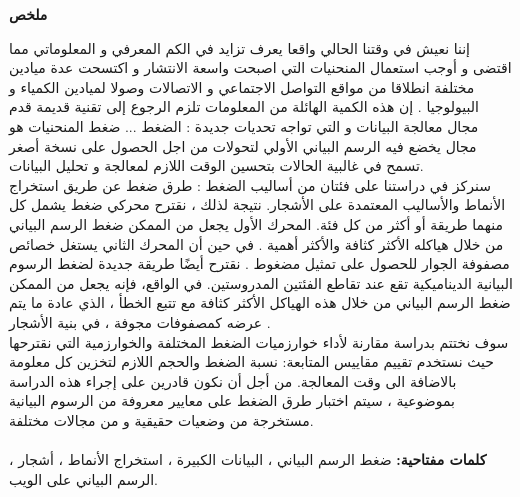 \documentclass[12pt,a4paper]{report}
\begin{document}
\begin{center}
\thispagestyle{plain}

	\par
	\textbf{
		\vskip 0.5in
		\LARGE ملخص
			 \\[0.35in]}
\end{center}


	\par
\begin{otherlanguage}{arabic}

إننا نعيش في وقتنا الحالي واقعا يعرف تزايد في الكم المعرفي و المعلوماتي مما اقتضى و أوجب استعمال المنحنيات التي اصبحت واسعة الانتشار و اكتسحت عدة ميادين مختلفة انطلاقا من مواقع التواصل الاجتماعي و الاتصالات وصولا لميادين الكمياء و البيولوجيا .  إن  هذه الكمية الهائلة من المعلومات تلزم الرجوع إلى  تقنية قديمة قدم مجال  معالجة البيانات و التي تواجه تحديات جديدة : الضغط ... ضغط المنحنيات هو مجال يخضع فيه الرسم البياني الأولي لتحولات من اجل الحصول على نسخة أصغر  تسمح في  غالبية الحالات بتحسين الوقت اللازم لمعالجة و تحليل البيانات.\\  

سنركز في دراستنا على فئتان من أساليب الضغط : طرق ضغط عن طريق استخراج الأنماط والأساليب المعتمدة على الأشجار. نتيجة لذلك ، نقترح محركي ضغط يشمل كل منهما طريقة أو أكثر من كل فئة. المحرك الأول يجعل من الممكن ضغط الرسم البياني من خلال هياكله الأكثر كثافة والأكثر أهمية . في حين أن المحرك الثاني يستغل خصائص مصفوفة الجوار للحصول على تمثيل مضغوط . نقترح أيضًا طريقة جديدة لضغط الرسوم البيانية الديناميكية تقع عند تقاطع الفئتين المدروستين. في الواقع، فإنه يجعل من الممكن ضغط الرسم البياني من خلال هذه الهياكل الأكثر كثافة مع تتبع الخطأ ، الذي عادة ما يتم عرضه كمصفوفات مجوفة ، في بنية الأشجار .\\

سوف نختتم بدراسة مقارنة لأداء خوارزميات الضغط المختلفة والخوارزمية التي نقترحها حيث نستخدم تقييم مقاييس المتابعة: نسبة الضغط والحجم اللازم لتخزين كل معلومة بالاضافة الى وقت المعالجة. من أجل أن نكون قادرين على إجراء هذه الدراسة بموضوعية ، سيتم اختبار طرق الضغط على معايير معروفة من الرسوم البيانية مستخرجة من وضعيات حقيقية و من مجالات مختلفة. \\\\



 \textbf{ 
 كلمات مفتاحية:} ضغط الرسم البياني ، البيانات الكبيرة ، استخراج الأنماط ، أشجار ، الرسم البياني على الويب.
 
\end{otherlanguage}
 
\newpage

       
\end{document}
